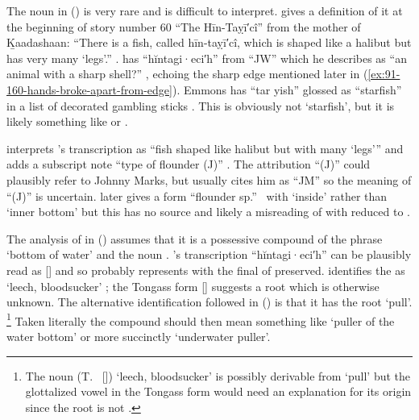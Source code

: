 The noun  in (\lastx) is very rare and is difficult to interpret.
\citeauthor{swanton:1909} gives a definition of it at the beginning of story number 60 “The Hīn-Taỵī′cî” from  the mother of Ḵaadashaan: “There is a fish, called hīn-taỵī′cî, which is shaped like a halibut but has very many ‘legs’.” \parencite[217]{swanton:1909}.
\citeauthor{olson:1967} has “hĭntagi·eci′h” from “JW” which he describes as “an animal with a sharp shell?” \parencite[39 col.\ 2]{olson:1967}, echoing the sharp edge mentioned later in (\ref{ex:91-160-hands-broke-apart-from-edge}).
Emmons has “tar yish” glossed as “starfish” in a list of decorated gambling sticks  \parencite[459 \#60]{emmons:1991}.
This is obviously not  ‘starfish’, but it is likely something like  or .

\citeauthor{leer:1973} interprets \citeauthor{swanton:1909}’s transcription as  “fish shaped like halibut but with many ‘legs’” and adds a subscript note “type of flounder (J)” \parencite[03/218]{leer:1973}.
The attribution “(J)” could plausibly refer to  Johnny Marks, but \citeauthor{leer:1973} usually cites him as “JM” so the meaning of “(J)” is uncertain.
\citeauthor{leer:1978b} later gives a form  “flounder sp.”\ \parencite[13]{leer:1978b} with  ‘inside’ rather than  ‘inner bottom’ but this has no source and likely a misreading of  with  reduced to .

The analysis of  in (\lastx) assumes that it is a possessive compound of the phrase  ‘bottom of water’ and the noun .
\citeauthor{olson:1967}’s transcription “hĭntagi·eci′h” can be plausibly read as [] and so probably represents  with the final  of  preserved.
\citeauthor{leer:1973} identifies the  as ‘leech, bloodsucker’ \parencite[03/218]{leer:1973}; the Tongass form  [] suggests a root  which is otherwise unknown.
The alternative identification followed in (\lastx) is that it has the root  ‘pull’.%
\footnote{The noun  (T.\  []) ‘leech, bloodsucker’ is possibly derivable from  ‘pull’ but the glottalized vowel in the Tongass form would need an explanation for its origin since the root is not .}
Taken literally the compound  should then mean something like ‘puller of the water bottom’ or more succinctly ‘underwater puller’.

